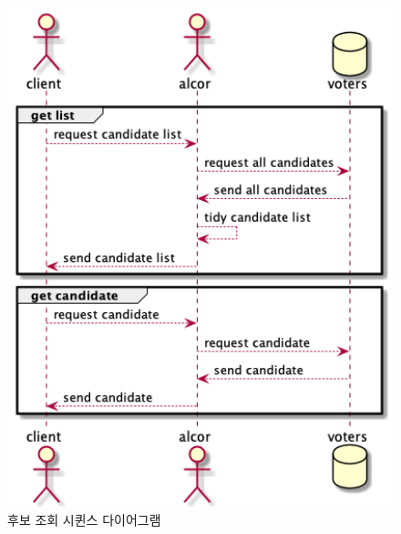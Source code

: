 \documentclass[8pt,a4paper,left=8mm,right=8mm,top=10mm,bottom=10mm]{article}
\begin{document}
    \begin{figure}[h]
        \begin{center}
            \includegraphics[width=14cm]{candidate-getlist}
            \caption{후보 조회 시퀸스 다이어그램}
        \end{center}
    \end{figure}
\end{document}
